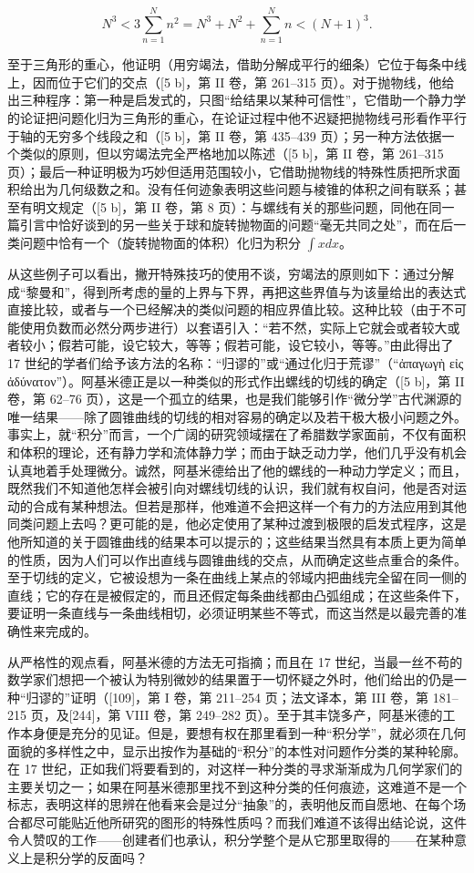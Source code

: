 \[
N ^ {3} <   3 \sum_ {n = 1} ^ {N} n ^ {2} = N ^ {3} + N ^ {2} + \sum_ {n = 1} ^ {N} n <   (N + 1) ^ {3}.
\]

至于三角形的重心，他证明（用穷竭法，借助分解成平行的细条）它位于每条中线上，因而位于它们的交点（{[}5 b{]}，第 II 卷，第 261–315 页）。对于抛物线，他给出三种程序：第一种是启发式的，只图“给结果以某种可信性”，它借助一个静力学的论证把问题化归为三角形的重心，在论证过程中他不迟疑把抛物线弓形看作平行于轴的无穷多个线段之和（{[}5 b{]}，第 II 卷，第 435–439 页）；另一种方法依据一个类似的原则，但以穷竭法完全严格地加以陈述（{[}5 b{]}，第 II 卷，第 261–315 页）；最后一种证明极为巧妙但适用范围较小，它借助抛物线的特殊性质把所求面积给出为几何级数之和。没有任何迹象表明这些问题与棱锥的体积之间有联系；甚至有明文规定（{[}5 b{]}，第 II 卷，第 8 页）：与螺线有关的那些问题，同他在同一篇引言中恰好谈到的另一些关于球和旋转抛物面的问题“毫无共同之处”，而在后一类问题中恰有一个（旋转抛物面的体积）化归为积分 \(\int x dx\)。

从这些例子可以看出，撇开特殊技巧的使用不谈，穷竭法的原则如下：通过分解成“黎曼和”，得到所考虑的量的上界与下界，再把这些界值与为该量给出的表达式直接比较，或者与一个已经解决的类似问题的相应界值比较。这种比较（由于不可能使用负数而必然分两步进行）以套语引入：“若不然，实际上它就会或者较大或者较小；假若可能，设它较大，等等；假若可能，设它较小，等等。”由此得出了 17 世纪的学者们给予该方法的名称：“归谬的”或“通过化归于荒谬”（“ἀπαγωγὴ εἰς ἀδύνατον”）。阿基米德正是以一种类似的形式作出螺线的切线的确定（{[}5 b{]}，第 II 卷，第 62–76 页），这是一个孤立的结果，也是我们能够引作“微分学”古代渊源的唯一结果——除了圆锥曲线的切线的相对容易的确定以及若干极大极小问题之外。事实上，就“积分”而言，一个广阔的研究领域摆在了希腊数学家面前，不仅有面积和体积的理论，还有静力学和流体静力学；而由于缺乏动力学，他们几乎没有机会认真地着手处理微分。诚然，阿基米德给出了他的螺线的一种动力学定义；而且，既然我们不知道他怎样会被引向对螺线切线的认识，我们就有权自问，他是否对运动的合成有某种想法。但若是那样，他难道不会把这样一个有力的方法应用到其他同类问题上去吗？更可能的是，他必定使用了某种过渡到极限的启发式程序，这是他所知道的关于圆锥曲线的结果本可以提示的；这些结果当然具有本质上更为简单的性质，因为人们可以作出直线与圆锥曲线的交点，从而确定这些点重合的条件。至于切线的定义，它被设想为一条在曲线上某点的邻域内把曲线完全留在同一侧的直线；它的存在是被假定的，而且还假定每条曲线都由凸弧组成；在这些条件下，要证明一条直线与一条曲线相切，必须证明某些不等式，而这当然是以最完善的准确性来完成的。

从严格性的观点看，阿基米德的方法无可指摘；而且在 17 世纪，当最一丝不苟的数学家们想把一个被认为特别微妙的结果置于一切怀疑之外时，他们给出的仍是一种“归谬的”证明（{[}109{]}，第 I 卷，第 211–254 页；法文译本，第 III 卷，第 181–215 页，及{[}244{]}，第 VIII 卷，第 249–282 页）。至于其丰饶多产，阿基米德的工作本身便是充分的见证。但是，要想有权在那里看到一种“积分学”，就必须在几何面貌的多样性之中，显示出按作为基础的“积分”的本性对问题作分类的某种轮廓。在 17 世纪，正如我们将要看到的，对这样一种分类的寻求渐渐成为几何学家们的主要关切之一；如果在阿基米德那里找不到这种分类的任何痕迹，这难道不是一个标志，表明这样的思辨在他看来会是过分“抽象”的，表明他反而自愿地、在每个场合都尽可能贴近他所研究的图形的特殊性质吗？而我们难道不该得出结论说，这件令人赞叹的工作——创建者们也承认，积分学整个是从它那里取得的——在某种意义上是积分学的反面吗？

